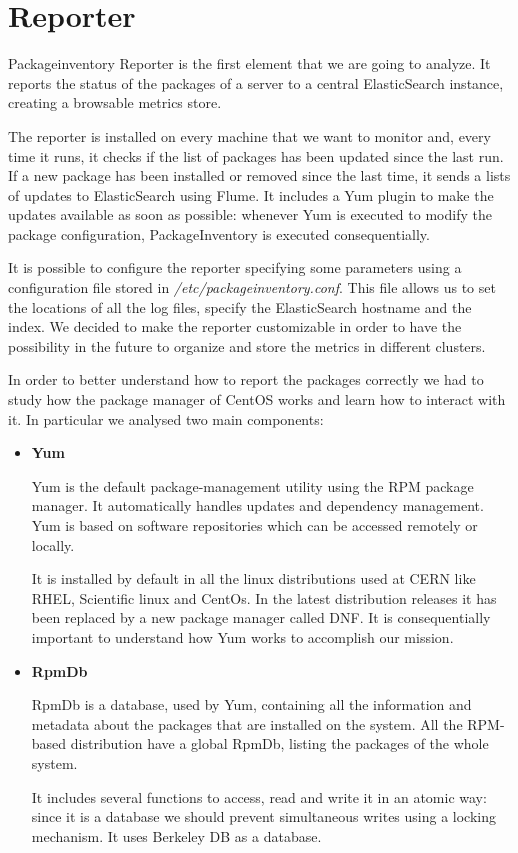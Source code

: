 \section{Reporter}

Packageinventory Reporter is the first element that we are going to
analyze. It reports the status of the packages of a server to a central
ElasticSearch instance, creating a browsable metrics store.

The reporter is installed on every machine that we want to monitor and,
every time it runs, it checks if the list of packages has been updated
since the last run. If a new package has been installed or removed since
the last time, it sends a lists of updates to ElasticSearch using Flume.
It includes a Yum plugin to make the updates available as soon as
possible: whenever Yum is executed to modify the package configuration,
PackageInventory is executed consequentially.

It is possible to configure the reporter specifying some parameters using
a configuration file stored in \textit{/etc/packageinventory.conf}. This
file allows us to set the locations of all the log files, specify the
ElasticSearch hostname and the index. We decided to make the reporter
customizable in order to have the possibility in the future to organize
and store the metrics in different clusters.

In order to better understand how to report the packages correctly we had
to study how the package manager of CentOS works and learn how to interact
with it. In particular we analysed two main components: 

\begin{itemize}
  \item \textbf{Yum}

  Yum is the default package-management utility using the RPM package
  manager. It automatically handles updates and dependency management. Yum
  is based on software repositories which can be accessed remotely or
  locally.
  
  It is installed by default in all the linux distributions used at CERN
  like RHEL, Scientific linux and CentOs. In the latest distribution
  releases it has been replaced by a new package manager called DNF. It is
  consequentially important to understand how Yum works to accomplish our
  mission.

  \item \textbf{RpmDb}

  RpmDb is a database, used by Yum, containing all the information and
  metadata about the packages that are installed on the system. All the
  RPM-based distribution have a global RpmDb, listing the packages of the
  whole system.
  
  It includes several functions to access, read and write it in an atomic
  way: since it is a database we should prevent simultaneous writes using
  a locking mechanism. It uses Berkeley DB as a database.

\end{itemize}

